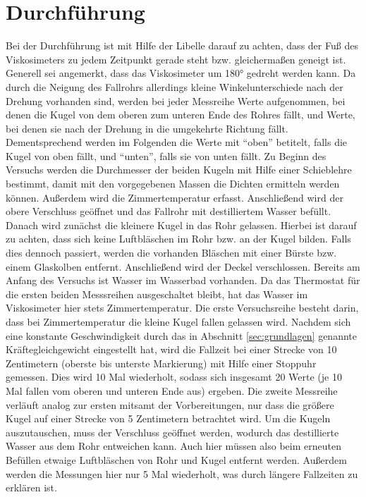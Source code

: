 \section{Durchführung}
Bei der Durchführung ist mit Hilfe der Libelle darauf zu achten, dass der Fuß des Viskosimeters zu jedem Zeitpunkt gerade steht
bzw. gleichermaßen geneigt ist.
Generell sei angemerkt, dass das Viskosimeter um 180° gedreht werden kann. 
Da durch die Neigung des Fallrohrs allerdings kleine Winkelunterschiede nach der Drehung vorhanden sind, werden bei jeder Messreihe Werte aufgenommen,
bei denen die Kugel von dem oberen zum unteren Ende des Rohres fällt, und Werte, bei denen sie nach der Drehung in die umgekehrte Richtung fällt.
Dementsprechend werden im Folgenden die Werte mit \enquote{oben} betitelt, falls die Kugel von oben fällt, und \enquote{unten}, falls sie von unten fällt.
Zu Beginn des Versuchs werden die Durchmesser der beiden Kugeln mit Hilfe einer Schieblehre bestimmt,
damit mit den vorgegebenen Massen die Dichten ermitteln werden können.
Außerdem wird die Zimmertemperatur erfasst.
Anschließend wird der obere Verschluss geöffnet und das Fallrohr mit destilliertem Wasser befüllt. 
Danach wird zunächst die kleinere Kugel in das Rohr gelassen.
Hierbei ist darauf zu achten, dass sich keine Luftbläschen im Rohr bzw. an der Kugel bilden.
Falls dies dennoch passiert, werden die vorhanden Bläschen mit einer Bürste bzw. einem Glaskolben entfernt.
Anschließend wird der Deckel verschlossen.
Bereits am Anfang des Versuchs ist Wasser im Wasserbad vorhanden. 
Da das Thermostat für die ersten beiden Messsreihen ausgeschaltet bleibt, hat das Wasser im Viskosimeter hier stets Zimmertemperatur.
%
Die erste Versuchsreihe besteht darin, dass bei Zimmertemperatur die kleine Kugel fallen gelassen wird.
Nachdem sich eine konstante Geschwindigkeit durch das in Abschnitt \ref{sec:grundlagen} genannte Kräftegleichgewicht eingestellt hat,
wird die Fallzeit bei einer Strecke von 10 Zentimetern (oberste bis unterste Markierung)
mit Hilfe einer Stoppuhr gemessen.
Dies wird 10 Mal wiederholt, sodass sich insgesamt 20 Werte (je 10 Mal fallen vom oberen und unteren Ende aus) ergeben.
%
Die zweite Messreihe verläuft analog zur ersten mitsamt der Vorbereitungen, nur dass die größere Kugel auf einer Strecke von 5 Zentimetern betrachtet wird.
Um die Kugeln auszutauschen, muss der Verschluss geöffnet werden, wodurch das destillierte Wasser aus dem Rohr entweichen kann.
Auch hier müssen also beim erneuten Befüllen etwaige Luftbläschen von Rohr und Kugel entfernt werden.
Außerdem werden die Messungen hier nur 5 Mal wiederholt, was durch längere Fallzeiten zu erklären ist.
